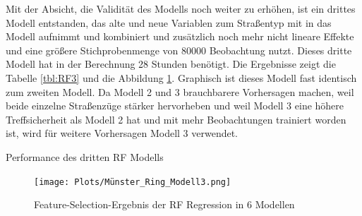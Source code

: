 \documentclass[a4paper,12pt]{thesis}
\begin{document}
Mit der Absicht, die Validität des Modells noch weiter zu erhöhen, ist ein drittes Modell entstanden, das alte und neue Variablen zum  Straßentyp mit in das Modell aufnimmt und kombiniert und zusätzlich noch mehr nicht lineare Effekte und eine größere Stichprobenmenge von 80000 Beobachtung nutzt. Dieses dritte Modell hat in der Berechnung 28 Stunden benötigt. Die Ergebnisse zeigt die Tabelle \ref{tbl:RF3} und die Abbildung \ref{Munster}. Graphisch ist dieses Modell fast identisch zum zweiten Modell. Da Modell 2 und 3 brauchbarere Vorhersagen machen, weil beide einzelne Straßenzüge stärker hervorheben und weil Modell 3 eine höhere Treffsicherheit als Modell 2 hat und mit mehr Beobachtungen trainiert worden ist, wird für weitere Vorhersagen Modell 3 verwendet.

\begin{table}
	\caption{Performance des dritten RF Modells}
	\label{tbl:RF3}
\end{table}

\begin{figure}[!ht]
	\centering
	\texttt{[image: Plots/Münster\_Ring\_Modell3.png]}
	\caption{Feature-Selection-Ergebnis der RF Regression in 6 Modellen}
	\label{Munster}
\end{figure}
\end{document}
